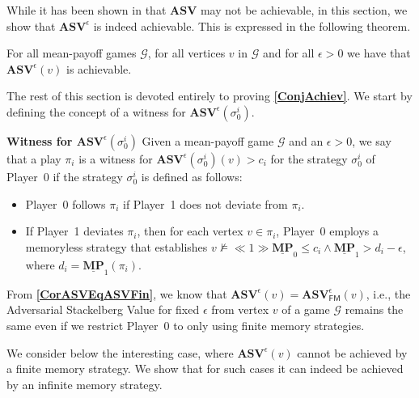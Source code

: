While it has been shown in \cite{FGR20} that \textbf{$\mathbf{ASV}$} may not be achievable, in this section, we show that $\mathbf{ASV}^{\epsilon}$ is indeed achievable. This is expressed in the following theorem.
\begin{theorem}
    \label{ConjAchiev}
    For all mean-payoff games $\mathcal{G}$, for all vertices $v$ in $\mathcal{G}$ and for all $\epsilon > 0$ we have that $\mathbf{ASV}^{\epsilon}(v)$ is achievable.
\end{theorem}

The rest of this section is devoted entirely to proving \textbf{\cref{ConjAchiev}}. We start by defining the concept of a witness for $\mathbf{ASV}^{\epsilon}(\sigma_0^i)$.

\textbf{Witness for $\mathbf{ASV}^{\epsilon}(\sigma_0^i)$}
Given a mean-payoff game $\mathcal{G}$ and an $\epsilon > 0$, we say that a play $\pi_i$ is a witness for $\mathbf{ASV}^{\epsilon}(\sigma_0^i)(v) > c_i$ for the strategy $\sigma_0^i$ of Player~0 if the strategy $\sigma_0^i$ is defined as follows:
\begin{itemize}
    \item Player~0 follows $\pi_i$ if Player~1 does not deviate from $\pi_i$.
    \item If Player~1 deviates $\pi_i$, then for each vertex $v \in \pi_i$, Player~0 employs a memoryless strategy that establishes $v \nvDash \ll 1 \gg \underline{\mathbf{MP}}_0 \leqslant c_i \land \underline{\mathbf{MP}}_1 > d_i - \epsilon$, where $d_i = \underline{\mathbf{MP}}_1(\pi_i)$.
\end{itemize}

From \textbf{\cref{CorASVEqASVFin}}, we know that $\mathbf{ASV}^{\epsilon}(v) = \mathbf{ASV}^{\epsilon}_{\mathsf{FM}}(v)$, i.e., the Adversarial Stackelberg Value for fixed $\epsilon$ from vertex $v$ of a game $\mathcal{G}$ remains the same even if we restrict Player~0 to only using finite memory strategies.


We consider below the interesting case, where $\mathbf{ASV}^{\epsilon}(v)$ cannot be achieved by a finite memory strategy.
We show that for such cases it can indeed be achieved by an infinite memory strategy.
 
